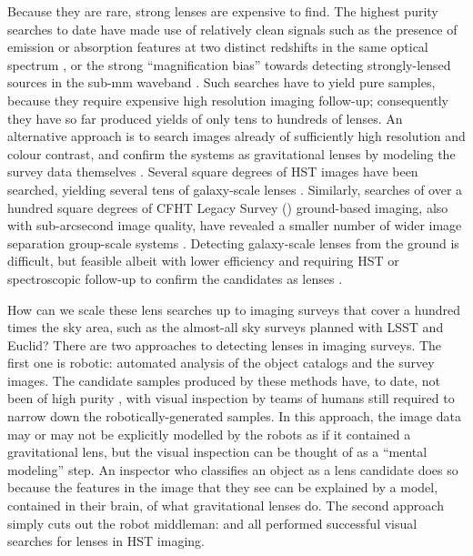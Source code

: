 \documentclass[useAMS,usenatbib,a4paper]{mn2e}
\begin{document}
Because they are rare, strong lenses are expensive to find. The highest purity
searches to date have made use of relatively clean signals such as the
presence of emission or absorption features at two distinct redshifts in the
same optical spectrum \citep[e.g.][]{BoltonEtal2004}, or the strong
``magnification bias'' towards detecting strongly-lensed sources in the sub-mm
waveband \citep[e.g.][]{NegrelloEtal2010}. Such searches have to yield pure samples,
because they require expensive high resolution imaging follow-up; consequently
they have so far produced yields of only tens to hundreds of lenses. An alternative
approach is to search images already of sufficiently high resolution and colour
contrast, and confirm the systems as gravitational lenses by modeling the
survey data themselves \citep[][]{MarshallEtal2009}. Several square degrees of
HST images have been searched, yielding several tens of galaxy-scale lenses
\citep[e.g.][]{MoustakasEtal2007,FaureEtal2008,Jackson2008,MoreEtal2011,
PawaseEtal2014}. Similarly, searches of over a hundred square degrees of CFHT
Legacy Survey (\cfhtls) ground-based imaging, also with sub-arcsecond image quality,
have revealed a smaller number of wider image separation group-scale systems
\citep[e.g.][]{CabanacEtal2007,MoreEtal2012}. Detecting galaxy-scale lenses
from the ground is difficult, but feasible albeit with lower efficiency and requiring
HST or spectroscopic follow-up to confirm the candidates as lenses
\citep[e.g.][]{GavazziEtal2014}.

How can we scale these lens searches up to imaging surveys that cover a hundred
times the sky area, such as the almost-all sky surveys planned with LSST and
Euclid?  There are two approaches to detecting lenses in imaging surveys. The
first one is robotic: automated analysis of the object catalogs and the survey
images. The candidate samples produced by these methods have, to date, not been
of high purity  \citep[see
e.g.][]{MarshallEtal2009,MoreEtal2012,GavazziEtal2014}, with visual inspection
by teams of humans still required to narrow down the robotically-generated
samples. In this approach, the image data may or may not be explicitly modelled
by the robots as if it contained a gravitational lens, but the visual inspection
can be thought of as a ``mental modeling'' step.  An inspector who classifies an
object as a lens candidate does so because the features in the image that they
see can be explained by a model, contained in their brain, of what gravitational
lenses do.  The second approach simply cuts out the robot middleman:
\citet{MoustakasEtal2007,FaureEtal2008,Jackson2008} and \citet{PawaseEtal2014}
all performed successful visual searches for lenses in HST imaging.
\end{document}
